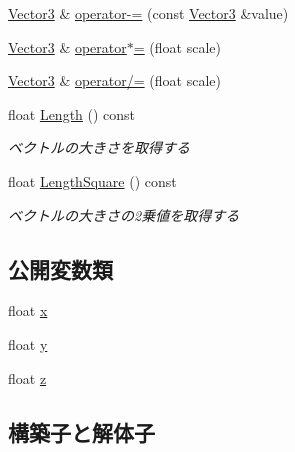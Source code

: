 \begin{DoxyCompactItemize}
\item 
\mbox{\hyperlink{struct_math_1_1_vector3}{Vector3}} \& \mbox{\hyperlink{struct_math_1_1_vector3_a9208e1fb073abed8764025d47c0a5493}{operator-\/=}} (const \mbox{\hyperlink{struct_math_1_1_vector3}{Vector3}} \&value)
\item 
\mbox{\hyperlink{struct_math_1_1_vector3}{Vector3}} \& \mbox{\hyperlink{struct_math_1_1_vector3_a39ef536f18b367782130106cb6fe9195}{operator$\ast$=}} (float scale)
\item 
\mbox{\hyperlink{struct_math_1_1_vector3}{Vector3}} \& \mbox{\hyperlink{struct_math_1_1_vector3_a21819f6a2578757c590ba3855f301451}{operator/=}} (float scale)
\item 
float \mbox{\hyperlink{struct_math_1_1_vector3_a8c5c7e6140a72c6ae5ec07027787a270}{Length}} () const
\begin{DoxyCompactList}\small\item\em ベクトルの大きさを取得する \end{DoxyCompactList}\item 
float \mbox{\hyperlink{struct_math_1_1_vector3_a387697120da28a70e122f4d51dc6552c}{Length\+Square}} () const
\begin{DoxyCompactList}\small\item\em ベクトルの大きさの2乗値を取得する \end{DoxyCompactList}\end{DoxyCompactItemize}
\subsection*{公開変数類}
\begin{DoxyCompactItemize}
\item 
float \mbox{\hyperlink{struct_math_1_1_vector3_a878843e917c48787b4e1fcffa8b4da3b}{x}}
\item 
float \mbox{\hyperlink{struct_math_1_1_vector3_a5d4c7c63b32834eb022f57965a1035f2}{y}}
\item 
float \mbox{\hyperlink{struct_math_1_1_vector3_a425203878d04e4e15de18527a4d3cd0f}{z}}
\end{DoxyCompactItemize}


\subsection{構築子と解体子}
\mbox{\label{struct_math_1_1_vector3_a0f49191f7e001e7f7ae1cb49522118b4}} 
